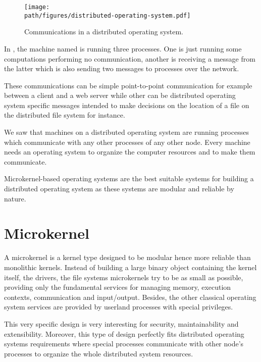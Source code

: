 \begin{figure}[h]
  \begin{center}
    \texttt{[image: \\path/figures/distributed-operating-system.pdf]}
    \caption{Communications in a distributed operating system.}
    \label{figure:distributed-operating-system}
  \end{center}
\end{figure}

In , the machine
named  is running three processes. One is just running some
computations performing no communication, another is receiving a message
from the latter which is also sending two messages to processes over the
network.

These communications can be simple point-to-point communication for example
between a client and a web server while other can be distributed operating
system specific messages intended to make decisions on the location of a file
on the distributed file system for instance.

We saw that machines on a distributed operating system are running processes
which communicate with any other processes of any other node. Every machine
needs an operating system to organize the computer resources and to make
them communicate.

Microkernel-based operating systems are the best suitable systems
for building a distributed operating system as these systems are modular
and reliable by nature.

%
%

\section{Microkernel}

A microkernel is a kernel type designed to be modular hence more reliable than
monolithic kernels. Instead of building a large binary object containing the
kernel itself, the drivers, the file systems \etc{} microkernels try to be as
small as possible, providing only the fundamental services for managing
memory, execution contexts, communication and input/output. Besides, the other
classical operating system services are provided by userland processes with
special privileges.

This very specific design is very interesting for security, maintainability
and extensibility. Moreover, this type of design perfectly fits
distributed operating systems requirements where special processes
communicate with other node's processes to organize the whole distributed
system resources.

